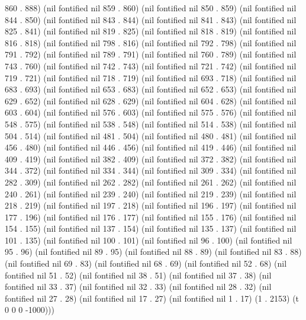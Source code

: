 860 . 888) (nil fontified nil 859 . 860) (nil fontified nil 850 . 859) (nil fontified nil 844 . 850) (nil fontified nil 843 . 844) (nil fontified nil 841 . 843) (nil fontified nil 825 . 841) (nil fontified nil 819 . 825) (nil fontified nil 818 . 819) (nil fontified nil 816 . 818) (nil fontified nil 798 . 816) (nil fontified nil 792 . 798) (nil fontified nil 791 . 792) (nil fontified nil 789 . 791) (nil fontified nil 760 . 789) (nil fontified nil 743 . 760) (nil fontified nil 742 . 743) (nil fontified nil 721 . 742) (nil fontified nil 719 . 721) (nil fontified nil 718 . 719) (nil fontified nil 693 . 718) (nil fontified nil 683 . 693) (nil fontified nil 653 . 683) (nil fontified nil 652 . 653) (nil fontified nil 629 . 652) (nil fontified nil 628 . 629) (nil fontified nil 604 . 628) (nil fontified nil 603 . 604) (nil fontified nil 576 . 603) (nil fontified nil 575 . 576) (nil fontified nil 548 . 575) (nil fontified nil 538 . 548) (nil fontified nil 514 . 538) (nil fontified nil 504 . 514) (nil fontified nil 481 . 504) (nil fontified nil 480 . 481) (nil fontified nil 456 . 480) (nil fontified nil 446 . 456) (nil fontified nil 419 . 446) (nil fontified nil 409 . 419) (nil fontified nil 382 . 409) (nil fontified nil 372 . 382) (nil fontified nil 344 . 372) (nil fontified nil 334 . 344) (nil fontified nil 309 . 334) (nil fontified nil 282 . 309) (nil fontified nil 262 . 282) (nil fontified nil 261 . 262) (nil fontified nil 240 . 261) (nil fontified nil 239 . 240) (nil fontified nil 219 . 239) (nil fontified nil 218 . 219) (nil fontified nil 197 . 218) (nil fontified nil 196 . 197) (nil fontified nil 177 . 196) (nil fontified nil 176 . 177) (nil fontified nil 155 . 176) (nil fontified nil 154 . 155) (nil fontified nil 137 . 154) (nil fontified nil 135 . 137) (nil fontified nil 101 . 135) (nil fontified nil 100 . 101) (nil fontified nil 96 . 100) (nil fontified nil 95 . 96) (nil fontified nil 89 . 95) (nil fontified nil 88 . 89) (nil fontified nil 83 . 88) (nil fontified nil 69 . 83) (nil fontified nil 68 . 69) (nil fontified nil 52 . 68) (nil fontified nil 51 . 52) (nil fontified nil 38 . 51) (nil fontified nil 37 . 38) (nil fontified nil 33 . 37) (nil fontified nil 32 . 33) (nil fontified nil 28 . 32) (nil fontified nil 27 . 28) (nil fontified nil 17 . 27) (nil fontified nil 1 . 17) (1 . 2153) (t 0 0 0 -1000)))
